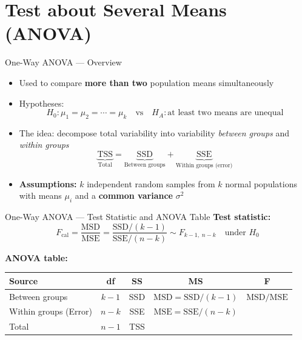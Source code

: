 \documentclass[12pt, aspectratio=169]{beamer}
\begin{document}
    \section{Test about Several Means (ANOVA)}


    \begin{frame}{One-Way ANOVA --- Overview}
        \begin{itemize}
            \item Used to compare \textbf{more than two} population means simultaneously
            \item Hypotheses:
            \[
                H_0: \mu_1 = \mu_2 = \cdots = \mu_k
                \quad \text{vs} \quad
                H_A: \text{at least two means are unequal}
            \]
            \item The idea: decompose total variability into variability
                \emph{between groups} and \emph{within groups}
            \[
                \underbrace{\text{TSS}}_{\text{Total}} =
                \underbrace{\text{SSD}}_{\text{Between groups}} +
                \underbrace{\text{SSE}}_{\text{Within groups (error)}}
            \]
            \item \textbf{Assumptions:} $k$ independent random samples from
                $k$ normal populations with means $\mu_i$ and a \textbf{common variance}
                $\sigma^2$
        \end{itemize}
    \end{frame}


    \begin{frame}{One-Way ANOVA --- Test Statistic and ANOVA Table}
        \textbf{Test statistic:}
        \[
            F_{\text{cal}} = \frac{\text{MSD}}{\text{MSE}}
            = \frac{\text{SSD}/(k-1)}{\text{SSE}/(n-k)}
            \sim F_{k-1,\;n-k} \quad \text{under } H_0
        \]

        \vspace{0.5em}

        \textbf{ANOVA table:}
        \begin{center}
            \begin{tabular}{lcccc}
                \toprule
                \textbf{Source} & \textbf{df} & \textbf{SS} & \textbf{MS} & \textbf{F} \\
                \midrule
                Between groups & $k-1$ & SSD & $\text{MSD} = \text{SSD}/(k-1)$ &
                    $\text{MSD}/\text{MSE}$ \\
                Within groups (Error) & $n-k$ & SSE & $\text{MSE} = \text{SSE}/(n-k)$ & \\
                Total & $n-1$ & TSS & & \\
                \bottomrule
            \end{tabular}
        \end{center}
    \end{frame}
\end{document}
